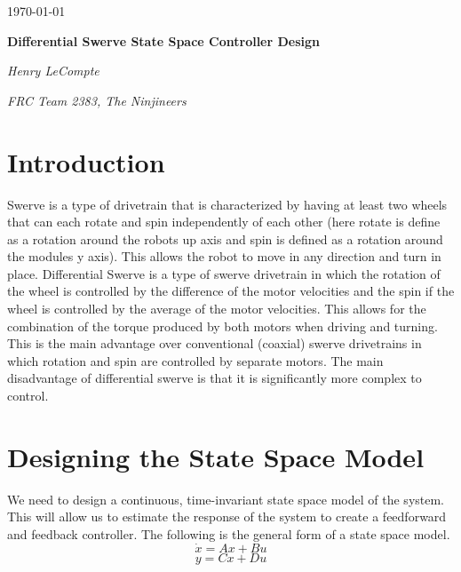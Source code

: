 \documentclass{scrartcl}
\begin{document}
\begin{titlepage}
    \centering
    {\large \today\par}
    \vfill

    {\huge\bfseries Differential Swerve State Space Controller Design\par}
    \vfill

    {\Large\itshape Henry LeCompte}\par
    {\itshape FRC Team 2383, The Ninjineers}\par
    \vspace{1.5cm}

    \vfill
\end{titlepage}

\newpage

\doublespacing
\tableofcontents
\singlespacing

\newpage

\doublespacing

\section{Introduction}
Swerve is a type of drivetrain that is characterized by having at least two wheels that can each rotate and spin independently of each other (here rotate is define as a rotation around the robots up axis and spin is defined as a rotation around the modules y axis). This allows the robot to move in any direction and turn in place. Differential Swerve is a type of swerve drivetrain in which the rotation of the wheel is controlled by the difference of the motor velocities and the spin if the wheel is controlled by the average of the motor velocities. This allows for the combination of the torque produced by both motors when driving and turning. This is the main advantage over conventional (coaxial) swerve drivetrains in which rotation and spin are controlled by separate motors. The main disadvantage of differential swerve is that it is significantly more complex to control.

\newpage
\section{Designing the State Space Model}

We need to design a continuous, time-invariant state space model of the system. This will allow us to estimate the response of the system to create a feedforward and feedback controller. The following is the general form of a state space model.
\begin{equation} \label{state-change}
    \dot{x} = Ax + Bu
\end{equation}
\begin{equation} \label{output}
    y = Cx + Du
\end{equation}
\end{document}
